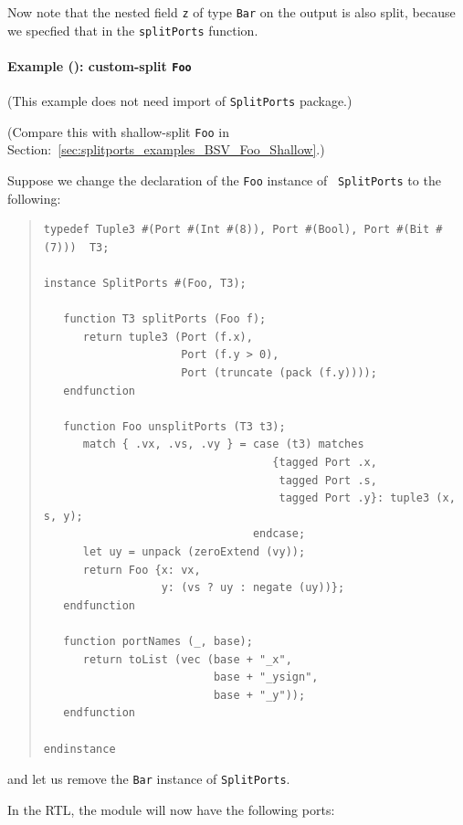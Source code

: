 Now note that the nested field {\tt z} of type {\tt Bar} on the output
is also split, because we specfied that in the {\tt splitPorts}
function.


\paragraph{Example (\BSV): custom-split {\tt Foo}}

\label{sec:splitports_examples_BSV_Foo_Custom}

\hspace*{1em}

{\footnotesize (This example does not need import of {\tt SplitPorts} package.)}

(Compare this with shallow-split {\tt Foo} in
Section:~\ref{sec:splitports_examples_BSV_Foo_Shallow}.)

Suppose we change the declaration of the {\tt Foo} instance of {\tt
SplitPorts} to the following:

\begin{quote}
\begin{verbatim}
typedef Tuple3 #(Port #(Int #(8)), Port #(Bool), Port #(Bit #(7)))  T3;

instance SplitPorts #(Foo, T3);

   function T3 splitPorts (Foo f);
      return tuple3 (Port (f.x),
                     Port (f.y > 0),
                     Port (truncate (pack (f.y))));
   endfunction

   function Foo unsplitPorts (T3 t3);
      match { .vx, .vs, .vy } = case (t3) matches
                                   {tagged Port .x,
                                    tagged Port .s,
                                    tagged Port .y}: tuple3 (x, s, y);
                                endcase;
      let uy = unpack (zeroExtend (vy));
      return Foo {x: vx,
                  y: (vs ? uy : negate (uy))};
   endfunction

   function portNames (_, base);
      return toList (vec (base + "_x",
                          base + "_ysign",
                          base + "_y"));
   endfunction

endinstance
\end{verbatim}
\end{quote}

and let us remove the {\tt Bar} instance of {\tt SplitPorts}.

In the RTL, the module will now have the following ports:


